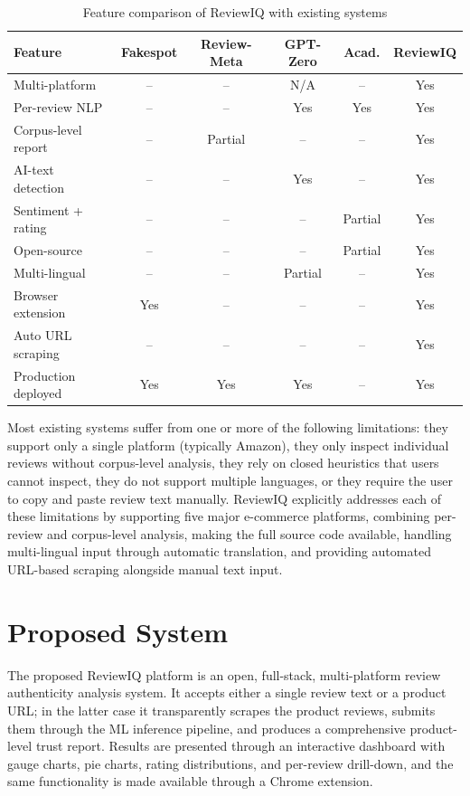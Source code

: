 \documentclass[12pt,a4paper,oneside]{report}
\begin{document}
\begin{table}[ht]
\centering
\caption{Feature comparison of ReviewIQ with existing systems}
\label{tab:comparison}
\small
\begin{tabularx}{\textwidth}{X c c c c c}
\toprule
\textbf{Feature} & \textbf{Fakespot} & \textbf{Review-Meta} & \textbf{GPT-Zero} & \textbf{Acad.} & \textbf{ReviewIQ} \\
\midrule
Multi-platform             & --     & --      & N/A    & --      & Yes \\
Per-review NLP             & --     & --      & Yes    & Yes     & Yes \\
Corpus-level report        & --     & Partial & --     & --      & Yes \\
AI-text detection          & --     & --      & Yes    & --      & Yes \\
Sentiment + rating         & --     & --      & --     & Partial & Yes \\
Open-source                & --     & --      & --     & Partial & Yes \\
Multi-lingual              & --     & --      & Partial & --     & Yes \\
Browser extension          & Yes    & --      & --     & --      & Yes \\
Auto URL scraping          & --     & --      & --     & --      & Yes \\
Production deployed        & Yes    & Yes     & Yes    & --      & Yes \\
\bottomrule
\end{tabularx}
\end{table}

Most existing systems suffer from one or more of the following
limitations: they support only a single platform (typically Amazon), they
only inspect individual reviews without corpus-level analysis, they rely
on closed heuristics that users cannot inspect, they do not support
multiple languages, or they require the user to copy and paste review
text manually. ReviewIQ explicitly addresses each of these limitations
by supporting five major e-commerce platforms, combining per-review and
corpus-level analysis, making the full source code available, handling
multi-lingual input through automatic translation, and providing automated
URL-based scraping alongside manual text input.

\section{Proposed System}
The proposed ReviewIQ platform is an open, full-stack, multi-platform
review authenticity analysis system. It accepts either a single review
text or a product URL; in the latter case it transparently scrapes the
product reviews, submits them through the ML inference pipeline, and
produces a comprehensive product-level trust report. Results are
presented through an interactive dashboard with gauge charts, pie charts,
rating distributions, and per-review drill-down, and the same
functionality is made available through a Chrome extension.
\end{document}
